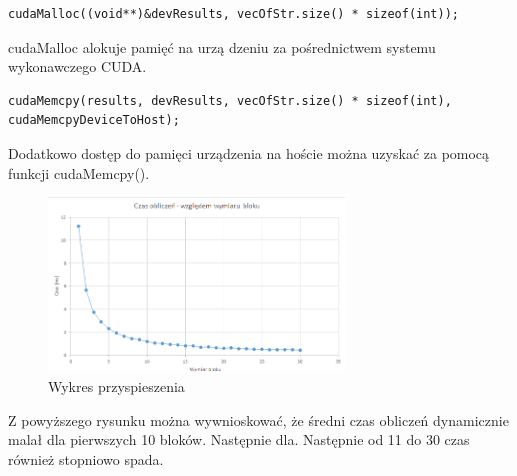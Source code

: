 \documentclass[a4paper,11pt]{article}
\begin{document}
\begin{lstlisting}
cudaMalloc((void**)&devResults, vecOfStr.size() * sizeof(int));
\end{lstlisting}
cudaMalloc alokuje pamięć na urzą­
dzeniu za pośrednictwem systemu wykonawczego CUDA.
\begin{lstlisting}
cudaMemcpy(results, devResults, vecOfStr.size() * sizeof(int), cudaMemcpyDeviceToHost);
\end{lstlisting}
Dodatkowo dostęp do pamięci urządzenia na hoście można uzyskać za pomocą funkcji
cudaMemcpy().
\begin{figure}[ht]
	\centering
  \includegraphics[width=0.7\textwidth]{2.png}
  \caption{Wykres przyspieszenia}
\end{figure}

Z powyższego rysunku można wywnioskować, że średni czas obliczeń dynamicznie malał dla pierwszych 10 bloków. Następnie dla. Następnie od 11 do 30 czas również stopniowo spada.
\end{document}
